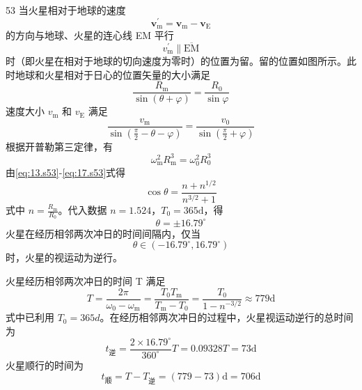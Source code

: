 \begin{solution}{53}
当火星相对于地球的速度
\begin{equation}
\pmb{v}_{\mathrm{m}}^{\prime} = \pmb{v}_{\mathrm{m}} - \pmb{v}_{\mathrm{E}}
\label{eq:13.s53}
\end{equation}
的方向与地球、火星的连心线 EM 平行
\begin{equation}
v_{\mathrm{m}}^{\prime} \parallel \overline{\mathrm{EM}}
\label{eq:14.s53}
\end{equation}
时（即火星在相对于地球的切向速度为零时）的位置为留。留的位置如图所示。此时地球和火星相对于日心的位置矢量的大小满足
\begin{equation}
\frac{R_{\mathrm{m}}}{\sin(\theta+\varphi)} = \frac{R_{0}}{\sin\varphi}
\label{eq:15.s53}
\end{equation}
速度大小 $v_{\mathrm{m}}$ 和 $v_{\mathrm{E}}$ 满足
\begin{equation}
\frac{v_{\mathrm{m}}}{\sin(\frac{\pi}{2}-\theta-\varphi)} = \frac{v_{0}}{\sin(\frac{\pi}{2}+\varphi)}
\label{eq:16.s53}
\end{equation}
根据开普勒第三定律，有
\begin{equation}
\omega_{\mathrm{m}}^{2}R_{\mathrm{m}}^{3} = \omega_{0}^{2}R_{0}^{3}
\label{eq:17.s53}
\end{equation}
由\eqref{eq:13.s53}-\eqref{eq:17.s53}式得
\begin{equation}
\cos\theta = \frac{n+n^{1/2}}{n^{3/2}+1}
\label{eq:18.s53}
\end{equation}
式中 $n = \frac{R_{\mathrm{m}}}{R_0}$。代入数据 $n = 1.524$，$T_{0} = 365\mathrm{d}$，得
\begin{equation}
\theta = \pm 16.79^{\circ}
\label{eq:19.s53}
\end{equation}
火星在经历相邻两次冲日的时间间隔内，仅当
\begin{equation}
\theta \in (-16.79^{\circ}, 16.79^{\circ})
\label{eq:20.s53}
\end{equation}
时，火星的视运动为逆行。

火星经历相邻两次冲日的时间 T 满足
\begin{equation}
T = \frac{2\pi}{\omega_{0}-\omega_{\mathrm{m}}} = \frac{T_{0}T_{\mathrm{m}}}{T_{\mathrm{m}}-T_{0}} = \frac{T_{0}}{1-n^{-3/2}} \approx 779\mathrm{d}
\label{eq:21.s53}
\end{equation}
式中已利用 $T_{0}=365d$。在经历相邻两次冲日的过程中，火星视运动逆行的总时间为
\begin{equation}
t_{\text{逆}} = \frac{2 \times 16.79^{\circ}}{360^{\circ}} T = 0.09328 T = 73\mathrm{d}
\label{eq:22.s53}
\end{equation}
火星顺行的时间为
\begin{equation}
t_{\text{顺}} = T - T_{\text{逆}} = (779 - 73)\mathrm{d} = 706\mathrm{d}
\label{eq:23.s53}
\end{equation}
\end{solution}